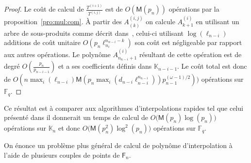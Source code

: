 \documentclass[10pt,a4paper]{book}
\theoremstyle{plain}
\theoremstyle{definition}
\theoremstyle{definition}
\theoremstyle{definition}
\theoremstyle{definition}
\theoremstyle{remark}
\theoremstyle{remark}
\theoremstyle{definition}
\begin{document}
\begin{proof}
  Le coût de calcul de $\frac{T^{(i+1)}}{T^{(i,j)}}$ est de 
  $O(\mathsf{M}(p_n))$ opérations  par la proposition~\ref{pro:mul:com}.
  \`A partir des $A^{(i,j)}_{(k)}$ on calcule $A^{(i)}_{k+1}$ en utilisant un arbre de 
  sous-produits comme décrit dans~\cite[Lemma~10.4]{vzGJG03}, celui-ci 
  utilisant $\log(\ell_{n-i})$ additions de coût unitaire 
  $O(p_n \ell_{n_i}^{n_{n-i}-k})$ son coût est négligeable par rapport aux 
  autres opérations. Le polynôme $A^{(i)}_{n_{n-i}+1}$ résultant de 
  cette opération est de degré $O(\frac{p_n}{p_{n-i-1}})$ et a ses coefficients
  définis dans $\mathbb{K}_{n-i-1}$.
  Le coût total est donc de 
  $O(n\max_i(\ell_{n-i})\mathsf{M}(p_{n}\max_i(d_{n-i}\ell_{n-i}^{n_{n-i}}))p_{n-1}^{(\omega-1)/2}))$ 
  opérations sur $\mathbb{F}_q$. 
    
\end{proof}

 
 Ce résultat est à comparer aux algorithmes d'interpolations rapides 
 tel que  celui présenté dans \cite[Chapter~10.2]{vzGJG03} il donnerait un temps
 de calcul de  $O\bigl(\mathsf{M}(p_n)\log(p_n)\bigr)$ opérations sur 
 $\mathbb{K}_n$ et donc $O\bigl(\mathsf{M}(p_n^2)\log^2(p_n)\bigr)$ opérations sur
 $\mathbb{F}_q$. 

On énonce un problème plus général de calcul de polynôme d'interpolation 
à l'aide de plusieurs couples de points de $\mathsf{F}_n$.
\end{document}
